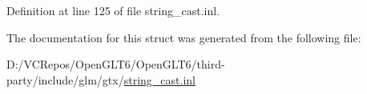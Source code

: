Definition at line 125 of file string\+\_\+cast.\+inl.



The documentation for this struct was generated from the following file\+:\begin{DoxyCompactItemize}
\item 
D\+:/\+V\+C\+Repos/\+Open\+G\+L\+T6/\+Open\+G\+L\+T6/third-\/party/include/glm/gtx/\mbox{\hyperlink{string__cast_8inl}{string\+\_\+cast.\+inl}}\end{DoxyCompactItemize}
